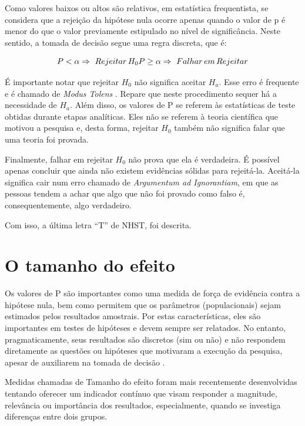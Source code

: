 \documentclass[
]{book}
\begin{document}
Como valores baixos ou altos são relativos, em estatística frequentista, se considera que a rejeição da hipótese nula ocorre apenas quando o valor de p é menor do que o valor previamente estipulado no nível de significância. Neste sentido, a tomada de decisão segue uma regra discreta, que é:

\[P<\alpha \Rightarrow \ Rejeitar \, H_0 \\P    \geq \alpha \Rightarrow \ Falhar \,em \,Rejeitar \]

É importante notar que rejeitar \(H_0\) não significa aceitar \(H_a\). Esse erro é frequente e é chamado de \emph{Modus Tolens} \citep{Trafimow2019}. Repare que neste procedimento sequer há a necessidade de \(H_a\). Além disso, os valores de P se referem às estatísticas de teste obtidas durante etapas analíticas. Eles não se referem à teoria científica que motivou a pesquisa e, desta forma, rejeitar \(H_0\) também não significa falar que uma teoria foi provada.

Finalmente, falhar em rejeitar \(H_0\) não prova que ela é verdadeira. É possível apenas concluir que ainda não existem evidências sólidas para rejeitá-la. Aceitá-la significa cair num erro chamado de \emph{Argumentum ad Ignorantiam}, em que as pessoas tendem a achar que algo que não foi provado como falso é, consequentemente, algo verdadeiro.

Com isso, a última letra ``T'' de NHST, foi descrita.

\hypertarget{o-tamanho-do-efeito}{%
\section{O tamanho do efeito}\label{o-tamanho-do-efeito}}

Os valores de P são importantes como uma medida de força de evidência contra a hipótese nula, bem como permitem que os parâmetros (populacionais) sejam estimados pelos resultados amostrais. Por estas características, eles são importantes em testes de hipóteses e devem sempre ser relatados. No entanto, pragmaticamente, seus resultados são discretos (sim ou não) e não respondem diretamente as questões ou hipóteses que motivaram a execução da pesquisa, apesar de auxiliarem na tomada de decisão \citep{Goodman1999}.

Medidas chamadas de Tamanho do efeito foram mais recentemente desenvolvidas tentando oferecer um indicador contínuo que visam responder a magnitude, relevância ou importância dos resultados, especialmente, quando se investiga diferenças entre dois grupos.
\end{document}
